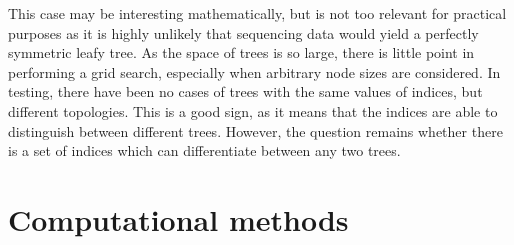 This case may be interesting mathematically, but is not too relevant for
practical purposes as it is highly unlikely that sequencing data would yield a
perfectly symmetric leafy tree. As the space of trees is so large, there is
little point in performing a grid search, especially when arbitrary node sizes
are considered. In testing, there have been no cases of trees with the same
values of indices, but different topologies. This is a good sign, as it means
that the indices are able to distinguish between different trees. However, the
question remains whether there is a set of indices which can differentiate
between any two trees.

\section{Computational methods}

